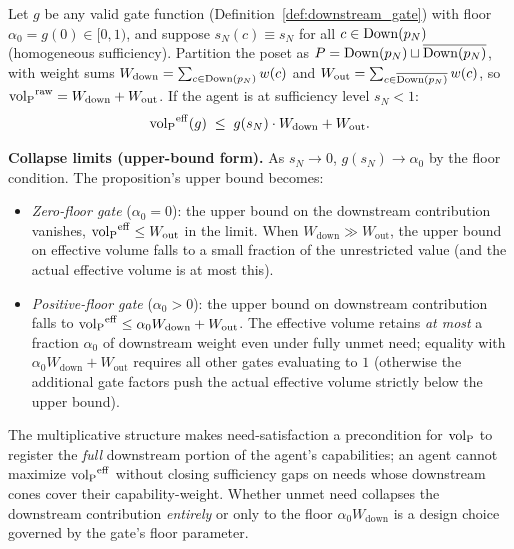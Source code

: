 \begin{proposition}
\label{prop:near_total_collapse}
Let $g$ be any valid gate function
(Definition~\ref{def:downstream_gate}) with floor $\alpha_0 =
g(0) \in [0, 1)$, and suppose $s_N(c) \equiv s_N$ for all $c \in
\mathrm{Down}(p_N)$ (homogeneous sufficiency).  Partition the poset as
$P = \mathrm{Down}(p_N) \sqcup \overline{\mathrm{Down}(p_N)}$, with weight sums
$W_{\mathrm{down}} = \sum_{c \in \mathrm{Down}(p_N)} w(c)$ and
$W_{\mathrm{out}} = \sum_{c \in \overline{\mathrm{Down}(p_N)}} w(c)$, so
${\operatorname{vol}_{\mathrm{P}}}^{\mathrm{raw}} = W_{\mathrm{down}} + W_{\mathrm{out}}$.
If the agent is at sufficiency level $s_N < 1$:
\[
  {\operatorname{vol}_{\mathrm{P}}}^{\mathrm{eff}}(g)
  \;\leq\; g(s_N) \cdot W_{\mathrm{down}} + W_{\mathrm{out}}.
\]

\medskip\noindent
\textbf{Collapse limits (upper-bound form).}
As $s_N \to 0$, $g(s_N) \to \alpha_0$ by the floor condition.
The proposition's upper bound becomes:
\begin{itemize}
\item \emph{Zero-floor gate} ($\alpha_0 = 0$): the upper bound
  on the downstream contribution vanishes,
  ${\operatorname{vol}_{\mathrm{P}}}^{\mathrm{eff}} \leq W_{\mathrm{out}}$ in the limit.
  When $W_{\mathrm{down}} \gg W_{\mathrm{out}}$, the upper
  bound on effective volume falls to a small fraction of the
  unrestricted value (and the actual effective volume is at
  most this).
\item \emph{Positive-floor gate} ($\alpha_0 > 0$): the upper
  bound on downstream contribution falls to
  ${\operatorname{vol}_{\mathrm{P}}}^{\mathrm{eff}} \leq \alpha_0 W_{\mathrm{down}} +
  W_{\mathrm{out}}$.  The effective volume retains \emph{at
  most} a fraction $\alpha_0$ of downstream weight even under
  fully unmet need; equality with $\alpha_0 W_{\mathrm{down}} +
  W_{\mathrm{out}}$ requires all other gates evaluating to $1$
  (otherwise the additional gate factors push the actual
  effective volume strictly below the upper bound).
\end{itemize}

\medskip\noindent
The multiplicative structure makes need-satisfaction a
precondition for ${\operatorname{vol}_{\mathrm{P}}}$ to register the \emph{full} downstream
portion of the agent's capabilities; an agent cannot maximize
${\operatorname{vol}_{\mathrm{P}}}^{\mathrm{eff}}$ without closing sufficiency gaps on needs
whose downstream cones cover their capability-weight.  Whether
unmet need collapses the downstream contribution \emph{entirely}
or only to the floor $\alpha_0 W_{\mathrm{down}}$ is a design
choice governed by the gate's floor parameter.
\end{proposition}

